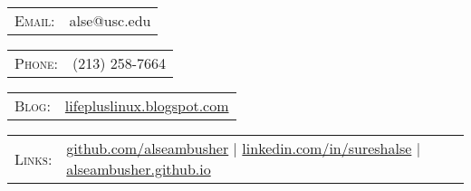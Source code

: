 \begin{tabular}{rl}
\textsc{Email:} & alse@usc.edu\\
\end{tabular}
\hfill
\begin{tabular}{rl}
\textsc{\hspace{2.0cm}Phone:} & (213) 258-7664\\
\end{tabular}
\hfill
\begin{tabular}{rl}
\textsc{Blog:} & \href{lifepluslinux.blogspot.com}{lifepluslinux.blogspot.com}\\
\end{tabular}
%
\begin{tabular}{rl}
\textsc{Links:} & \href{http://github.com/alseambusher}{github.com/alseambusher} \hspace{.5cm}|\hspace{.5cm} \href{http://linkedin.com/in/sureshalse}{linkedin.com/in/sureshalse} \hspace{.5cm}|\hspace{.3cm} \href{alseambusher.github.io}{alseambusher.github.io}
\end{tabular}
\vspace{5pt}

